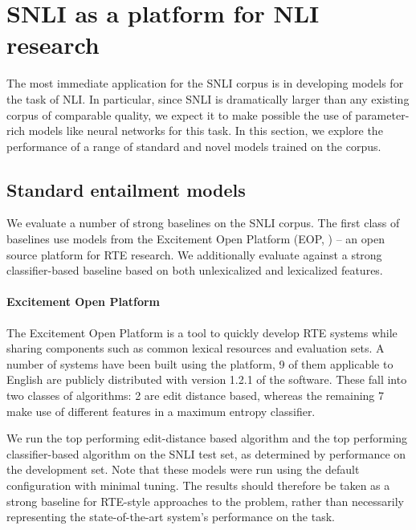 \section{SNLI as a platform for NLI research}

The most immediate application for the SNLI corpus is in developing models for the task of NLI. In particular, since SNLI is dramatically larger than any existing corpus of comparable quality, we expect it to make possible the use of parameter-rich models like neural networks for this task. In this section, we explore the performance of a range of standard and novel models trained on the corpus.

\subsection{Standard entailment models}
We evaluate a number of strong baselines on the SNLI corpus.
The first class of baselines use models from the Excitement Open
  Platform (EOP,
  \citealt{pado2014design,magnini2014excitement})
  -- an open source platform for RTE research.
We additionally evaluate against a strong classifier-based baseline based on
  both  unlexicalized and lexicalized features.


%
%
\paragraph{Excitement Open Platform}
The Excitement Open Platform is a tool to quickly develop RTE systems
  while sharing components such as common lexical resources and 
  evaluation sets.
A number of systems have been built using the platform, 9 of them
  applicable to English are publicly distributed with version 1.2.1
  of the software.
These fall into two classes of algorithms: 2 are edit distance based,
  whereas the remaining 7 make use of different features in a
  maximum entropy classifier.

We run the top performing edit-distance based algorithm and the top
  performing classifier-based algorithm on the SNLI test set, as
  determined by performance on the development set.
Note that these models were run using the default configuration
  with minimal tuning.
The results should therefore be taken as a strong baseline for
  RTE-style approaches to the problem, rather than necessarily
  representing the state-of-the-art system's performance on the
  task.

